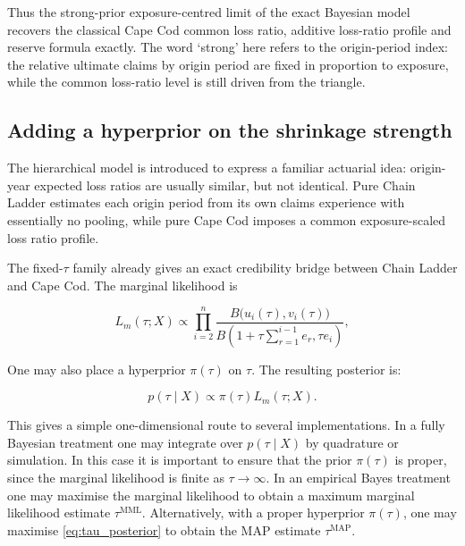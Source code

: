 \documentclass[11pt]{article}
\newcommand{\1}{\mathbf{1}}
\begin{document}
Thus the strong-prior exposure-centred limit of the exact Bayesian model recovers the classical Cape Cod common loss ratio, 
additive loss-ratio profile and reserve formula exactly. 
The word `strong' here refers to the origin-period index: the relative ultimate claims by origin period 
are fixed in proportion to exposure, while the common loss-ratio level is still driven from the triangle.



\subsection{Adding a hyperprior on the shrinkage strength}\label{subsec:tau_hyperprior}

The hierarchical model is introduced to express a familiar actuarial idea: origin-year expected loss ratios 
are usually similar, but not identical. Pure Chain Ladder estimates each origin period from its own claims 
experience with essentially no pooling, while pure Cape Cod imposes a common exposure-scaled loss ratio profile. 

The fixed-$\tau$ family already gives an exact credibility bridge between Chain Ladder and Cape Cod. The marginal likelihood is

\begin{equation}
L_m(\tau;X)
\propto
\prod_{i=2}^{n}
\frac{B\bigl(u_i(\tau),v_i(\tau)\bigr)}
{B\!\left(1+\tau\sum_{r=1}^{i-1}e_r,\tau e_i\right)},
\label{eq:marginal_likelihood_tau}
\end{equation}

One may also place a hyperprior $\pi(\tau)$ on $\tau$. The resulting posterior is:

\begin{equation}
p(\tau\mid X)
\propto
\pi(\tau)L_m(\tau;X).
\label{eq:tau_posterior}
\end{equation}

This gives a simple one-dimensional route to several implementations. In a fully Bayesian treatment one may integrate over $p(\tau\mid X)$ by 
quadrature or simulation. In this case it is important to ensure that the prior $\pi(\tau)$ is proper, since the marginal likelihood is finite as $\tau\rightarrow\infty$. In an empirical Bayes treatment one may maximise the marginal likelihood to obtain a maximum marginal likelihood estimate $\tau^{\mathrm{MML}}$. Alternatively, with a proper hyperprior $\pi(\tau)$, one may maximise \eqref{eq:tau_posterior} to obtain the MAP estimate $\tau^{\mathrm{MAP}}$. 
\end{document}
